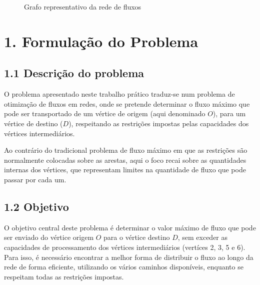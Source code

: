 \documentclass[a4paper,12pt]{article}
\begin{document}
\begin{figure}[H]
    \centering
    \caption{Grafo representativo da rede de fluxos}
    \label{fig:network-graph}
\end{figure}

\section*{1. Formulação do Problema}
\subsection*{1.1 Descrição do problema}
O problema apresentado neste trabalho prático traduz-se num problema de otimização de fluxos em redes, onde se pretende determinar o fluxo máximo que pode ser transportado de um vértice de origem (aqui denominado $O$), para um vértice de destino ($D$), respeitando as restrições impostas pelas capacidades dos vértices intermediários.

\vspace{0.5em}

Ao contrário do tradicional problema de fluxo máximo em que as restrições são normalmente colocadas sobre as arestas, aqui o foco recai sobre as quantidades internas dos vértices, que representam limites na quantidade de fluxo que pode passar por cada um.

\subsection*{1.2 Objetivo}
O objetivo central deste problema é determinar o valor máximo de fluxo que pode ser enviado do vértice origem $O$ para o vértice destino $D$, sem exceder as capacidades de processamento dos vértices intermediários (vertíces 2, 3, 5 e 6). Para isso, é necessário encontrar a melhor forma de distribuir o fluxo ao longo da rede de forma eficiente, utilizando os vários caminhos disponíveis, enquanto se respeitam todas as restrições impostas.
\end{document}
